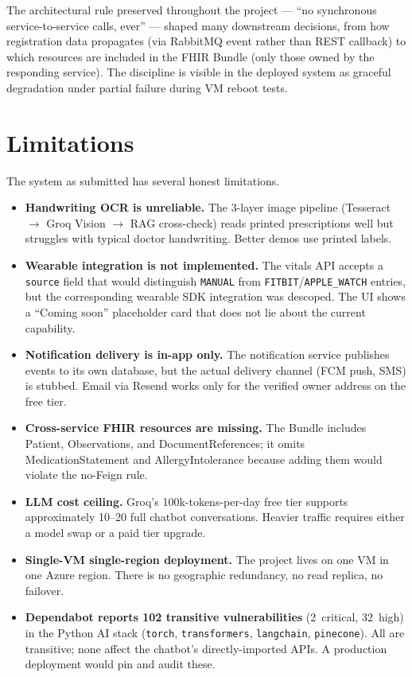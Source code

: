 \documentclass[12pt]{caltech_thesis}
\begin{document}
The architectural rule preserved throughout the project --- ``no
synchronous service-to-service calls, ever'' --- shaped many downstream
decisions, from how registration data propagates (via RabbitMQ event
rather than REST callback) to which resources are included in the FHIR
Bundle (only those owned by the responding service). The discipline is
visible in the deployed system as graceful degradation under partial
failure during VM reboot tests.

\section{Limitations}

The system as submitted has several honest limitations.

\begin{itemize}
    \item \textbf{Handwriting OCR is unreliable.} The 3-layer image
    pipeline (Tesseract $\rightarrow$ Groq Vision $\rightarrow$ RAG
    cross-check) reads printed prescriptions well but struggles with
    typical doctor handwriting. Better demos use printed labels.
    \item \textbf{Wearable integration is not implemented.} The vitals
    API accepts a \texttt{source} field that would distinguish
    \texttt{MANUAL} from \texttt{FITBIT}/\texttt{APPLE\_WATCH} entries,
    but the corresponding wearable SDK integration was descoped. The
    UI shows a ``Coming soon'' placeholder card that does not lie about
    the current capability.
    \item \textbf{Notification delivery is in-app only.} The notification
    service publishes events to its own database, but the actual
    delivery channel (FCM push, SMS) is stubbed. Email via Resend works
    only for the verified owner address on the free tier.
    \item \textbf{Cross-service FHIR resources are missing.} The
    Bundle includes Patient, Observations, and DocumentReferences; it
    omits MedicationStatement and AllergyIntolerance because adding
    them would violate the no-Feign rule.
    \item \textbf{LLM cost ceiling.} Groq's 100k-tokens-per-day free
    tier supports approximately 10--20 full chatbot conversations.
    Heavier traffic requires either a model swap or a paid tier upgrade.
    \item \textbf{Single-VM single-region deployment.} The project
    lives on one VM in one Azure region. There is no geographic
    redundancy, no read replica, no failover.
    \item \textbf{Dependabot reports 102 transitive vulnerabilities}
    (2~critical, 32~high) in the Python AI stack (\texttt{torch},
    \texttt{transformers}, \texttt{langchain}, \texttt{pinecone}). All
    are transitive; none affect the chatbot's directly-imported APIs.
    A production deployment would pin and audit these.
\end{itemize}
\end{document}

